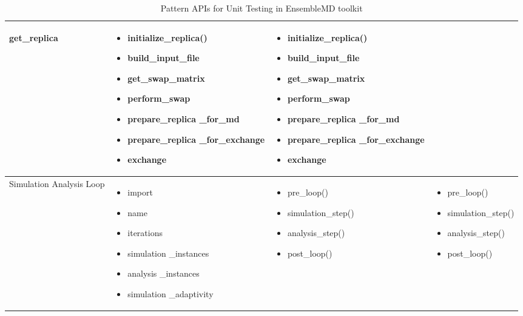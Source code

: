 \documentclass[10pt]{ruthesis}
\begin{document}
\begin{table}
\begin{center}
\begin{tabular}{|p{2cm}|p{3cm}|p{5cm}|p{5cm}|}
\begin{itemize}
	get\_replica
	\end{itemize}
	&
	\begin{itemize}
	\item initialize\_replica()
	\item build\_input\_file
	\item get\_swap\_matrix
	\item perform\_swap
	\item prepare\_replica
	\_for\_md
	\item prepare\_replica
	\_for\_exchange
	\item exchange 
	\end{itemize}
	&
	\begin{itemize}
	\item initialize\_replica()
	\item build\_input\_file
	\item get\_swap\_matrix
	\item perform\_swap
	\item prepare\_replica
	\_for\_md
	\item prepare\_replica
	\_for\_exchange
	\item exchange 
	\end{itemize}
\\
\hline
Simulation Analysis Loop &
	\begin{itemize}
	\item import
	\item name
	\item iterations
	\item simulation
	\_instances
	\item analysis
	\_instances
	\item simulation
	\_adaptivity
	\end{itemize}
	&
	\begin{itemize}
	\item pre\_loop()
	\item simulation\_step()
	\item analysis\_step()
	\item post\_loop() 
	\end{itemize}
	&
	\begin{itemize}
	\item pre\_loop()
	\item simulation\_step()
	\item analysis\_step()
	\item post\_loop() 
	\end{itemize}
\\
\hline
\end{tabular}
\end{center}
\caption{Pattern APIs for Unit Testing in EnsembleMD toolkit}
\label{enmdapitable}
\end{table}
\end{document}
